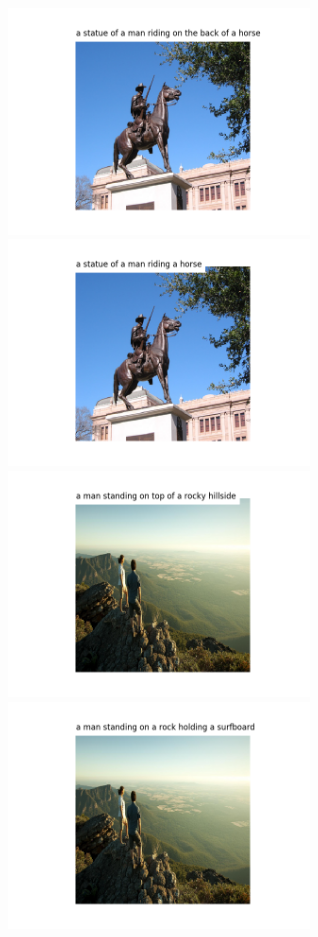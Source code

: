 \documentclass{article}
\begin{document}
\hspace*{-1cm}\includegraphics[width=80mm]{images/Figure_11.png}
\hspace*{-1cm}\includegraphics[width=80mm]{images/MFigure_11.png}
\hspace*{-1cm}\includegraphics[width=80mm]{images/Figure_22.png}
\hspace*{-1cm}\includegraphics[width=80mm]{images/MFigure_22.png}
\end{document}
